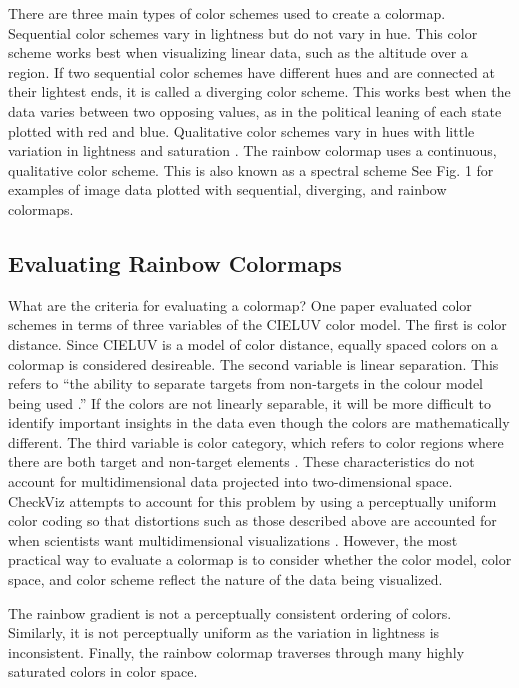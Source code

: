\documentclass[journal,12pt]{IEEEtran}
\begin{document}
There are three main types of color schemes used to create a colormap.
Sequential color schemes vary in lightness but do not
vary in hue. This color scheme works best when visualizing linear data, such as the altitude over a region.
If two sequential color schemes have different hues and are
connected at their lightest ends, it is called a diverging color scheme. This works best when
the data varies between two opposing values, as in the political leaning of each state plotted 
with red and blue. Qualitative color
schemes vary in hues with little variation in lightness
and saturation \cite{colormapping}. The rainbow colormap uses a continuous,
qualitative color scheme. This is also known as a spectral scheme \cite{spectralschemes}
See Fig. 1 for examples of image data plotted with 
sequential, diverging, and rainbow colormaps.

\subsection{Evaluating Rainbow Colormaps}

What are the criteria for evaluating a colormap?
One paper evaluated color schemes in terms of
three variables of the CIELUV color model. The first
is color distance. Since CIELUV is a model of color distance,
equally spaced colors on a colormap is considered desireable. The second variable is linear separation.
This refers to “the ability to separate targets
from non-targets in the colour model being
used \cite{colorchoice}.” If the
colors are not linearly separable, it
will be more difficult to identify important insights in the data even though the
colors are mathematically different. The third variable
is color category, which refers to color regions where
there are both target and non-target elements \cite{colorchoice}.
These characteristics do not account for multidimensional data projected into two-dimensional
space. CheckViz attempts to account for this problem
by using a perceptually uniform color coding so that
distortions such as those described above are accounted for when 
scientists want multidimensional visualizations \cite{checkviz}.
However, the most practical way to evaluate a colormap is to consider whether the color
model, color space, and color scheme reflect the nature of the data being visualized.

The rainbow gradient is not a perceptually consistent ordering of colors. Similarly, it
is not perceptually uniform as the variation in lightness is inconsistent.
Finally, the rainbow colormap traverses through many
highly saturated colors in color space.
\end{document}
